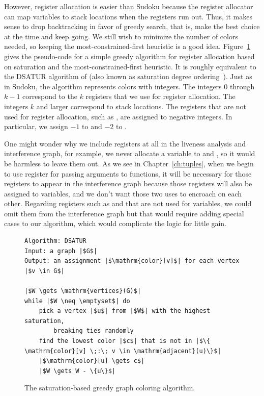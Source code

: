 \documentclass[11pt]{book}
\begin{document}
However, register allocation is easier than Sudoku because the
register allocator can map variables to stack locations when the
registers run out. Thus, it makes sense to drop backtracking in favor
of greedy search, that is, make the best choice at the time and keep
going. We still wish to minimize the number of colors needed, so
keeping the most-constrained-first heuristic is a good idea.
Figure~\ref{fig:satur-algo} gives the pseudo-code for a simple greedy
algorithm for register allocation based on saturation and the
most-constrained-first heuristic. It is roughly equivalent to the
DSATUR algorithm of \cite{Brelaz:1979eu} (also known as saturation
degree ordering~\citep{Gebremedhin:1999fk,Omari:2006uq}).  Just as in
Sudoku, the algorithm represents colors with integers. The integers
$0$ through $k-1$ correspond to the $k$ registers that we use for
register allocation. The integers $k$ and larger correspond to stack
locations. The registers that are not used for register allocation,
such as , are assigned to negative integers. In particular,
we assign $-1$ to  and $-2$ to .

One might wonder why we include registers at all in the liveness
analysis and interference graph, for example, we never allocate a
variable to  and , so it would be harmless to
leave them out.  As we see in Chapter~\ref{ch:tuples}, when we begin
to use register for passing arguments to functions, it will be
necessary for those registers to appear in the interference graph
because those registers will also be assigned to variables, and we
don't want those two uses to encroach on each other. Regarding
registers such as  and  that are not used for
variables, we could omit them from the interference graph but that
would require adding special cases to our algorithm, which would
complicate the logic for little gain.


\begin{figure}[btp]
  \centering
\begin{lstlisting}[basicstyle=\rmfamily,deletekeywords={for,from,with,is,not,in,find},morekeywords={while},columns=fullflexible]
Algorithm: DSATUR
Input: a graph |$G$|
Output: an assignment |$\mathrm{color}[v]$| for each vertex |$v \in G$|

|$W \gets \mathrm{vertices}(G)$|
while |$W \neq \emptyset$| do
    pick a vertex |$u$| from |$W$| with the highest saturation,
        breaking ties randomly
    find the lowest color |$c$| that is not in |$\{ \mathrm{color}[v] \;:\; v \in \mathrm{adjacent}(u)\}$|
    |$\mathrm{color}[u] \gets c$|
    |$W \gets W - \{u\}$|
\end{lstlisting}
  \caption{The saturation-based greedy graph coloring algorithm.}
  \label{fig:satur-algo}
\end{figure}
\end{document}
